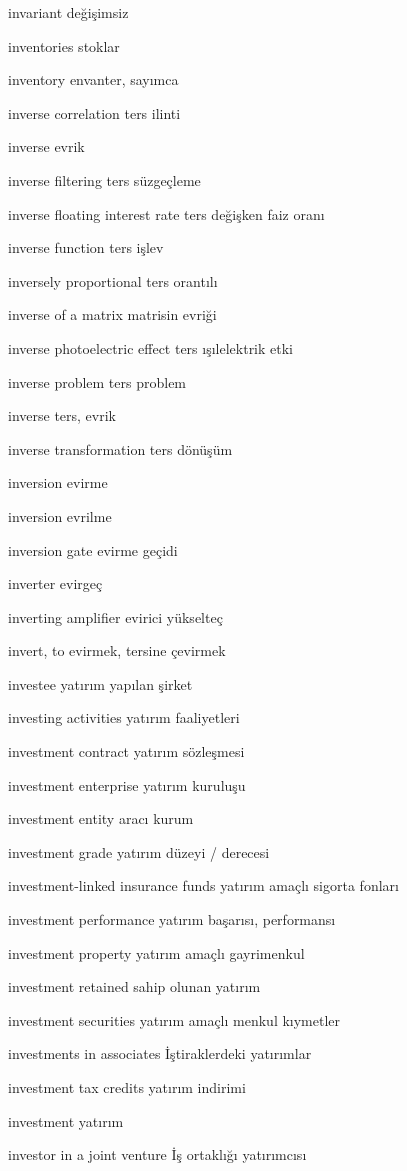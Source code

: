 \documentclass[12pt,fleqn]{article}\usepackage{../../common}
\begin{document}
invariant değişimsiz

inventories stoklar

inventory envanter, sayımca

inverse correlation ters ilinti

inverse evrik

inverse filtering ters süzgeçleme

inverse floating interest rate ters değişken faiz oranı

inverse function ters işlev

inversely proportional ters orantılı

inverse of a matrix matrisin evriği

inverse photoelectric effect ters ışılelektrik etki

inverse problem ters problem

inverse ters, evrik

inverse transformation ters dönüşüm

inversion evirme

inversion evrilme

inversion gate evirme geçidi

inverter evirgeç

inverting amplifier evirici yükselteç

invert, to evirmek, tersine çevirmek

investee yatırım yapılan şirket

investing activities yatırım faaliyetleri

investment contract yatırım sözleşmesi

investment enterprise yatırım kuruluşu

investment entity aracı kurum

investment grade yatırım düzeyi / derecesi

investment-linked insurance funds yatırım amaçlı sigorta fonları

investment performance yatırım başarısı, performansı

investment property yatırım amaçlı gayrimenkul

investment retained sahip olunan yatırım

investment securities yatırım amaçlı menkul kıymetler

investments in associates İştiraklerdeki yatırımlar

investment tax credits yatırım indirimi

investment yatırım

investor in a joint venture İş ortaklığı yatırımcısı
\end{document}
